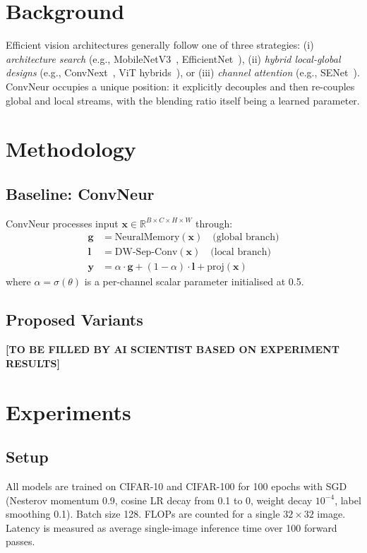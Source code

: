\documentclass{article} %
\begin{document}
\section{Background}
\label{sec:background}
Efficient vision architectures generally follow one of three strategies: (i) \textit{architecture search} (e.g., MobileNetV3~\citep{howard2019mobilenetv3}, EfficientNet~\citep{tan2019efficientnet}), (ii) \textit{hybrid local-global designs} (e.g., ConvNext~\citep{liu2022convnext}, ViT hybrids~\citep{dosovitskiy2020vit}), or (iii) \textit{channel attention} (e.g., SENet~\citep{hu2018senet}). ConvNeur occupies a unique position: it explicitly decouples and then re-couples global and local streams, with the blending ratio itself being a learned parameter.

\section{Methodology}
\label{sec:method}

\subsection{Baseline: ConvNeur}
ConvNeur processes input $\mathbf{x} \in \mathbb{R}^{B \times C \times H \times W}$ through:
\begin{align}
\mathbf{g} &= \text{NeuralMemory}(\mathbf{x}) \quad \text{(global branch)} \\
\mathbf{l} &= \text{DW-Sep-Conv}(\mathbf{x}) \quad \text{(local branch)} \\
\mathbf{y} &= \alpha \cdot \mathbf{g} + (1 - \alpha) \cdot \mathbf{l} + \text{proj}(\mathbf{x})
\end{align}
where $\alpha = \sigma(\theta)$ is a per-channel scalar parameter initialised at 0.5.

\subsection{Proposed Variants}
\textbf{[TO BE FILLED BY AI SCIENTIST BASED ON EXPERIMENT RESULTS]}

\section{Experiments}
\label{sec:experiments}

\subsection{Setup}
All models are trained on CIFAR-10 and CIFAR-100 for 100 epochs with SGD (Nesterov momentum 0.9, cosine LR decay from 0.1 to 0, weight decay $10^{-4}$, label smoothing 0.1). Batch size 128. FLOPs are counted for a single $32 \times 32$ image. Latency is measured as average single-image inference time over 100 forward passes.
\end{document}
